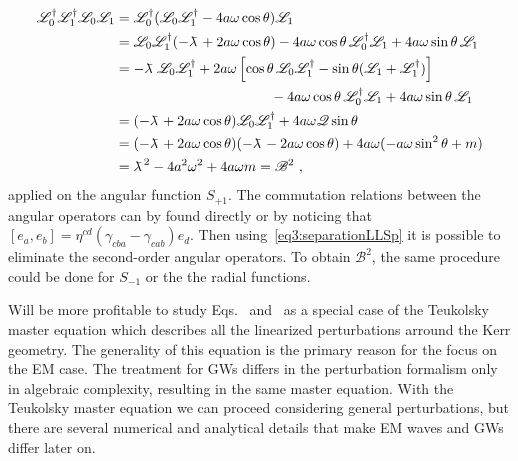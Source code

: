 \begin{align}
    \begin{split}
        \mathscr{L}^\dagger_0 \mathscr{L}^\dagger_1 \mathscr{L}_0 \mathscr{L}_1 &=
        \mathscr{L}^\dagger_0 ( \mathscr{L}_0 \mathscr{L}^\dagger_1 - 4 a\omega \cos\theta )\mathscr{L}_1 \\
        &= \mathscr{L}_0 \mathscr{L}^\dagger_1 ( - \lambdabar + 2 a\omega \cos\theta) - 4 a\omega \cos\theta \,\mathscr{L}^\dagger_0 \mathscr{L}_1 + 4 a\omega \sin\theta \,\mathscr{L}_1 \\
        &= -\lambdabar \, \mathscr{L}_0 \mathscr{L}^\dagger_1 + 2 a\omega \left[ \cos\theta \, \mathscr{L}_0 \mathscr{L}^\dagger_1 -\sin\theta(\mathscr{L}_1+\mathscr{L}^\dagger_1) \right] \\ &\mkern200mu - 4 a\omega \cos\theta \,\mathscr{L}^\dagger_0 \mathscr{L}_1 + 4 a\omega \sin\theta \,\mathscr{L}_1 \\
        &= (-\lambdabar + 2 a\omega \cos\theta ) \mathscr{L}_0 \mathscr{L}^\dagger_1 + 4 a\omega \mathscr{Q} \sin\theta \\
        &= (-\lambdabar + 2 a\omega \cos\theta ) (-\lambdabar - 2 a\omega \cos\theta ) + 4 a\omega ( -a\omega \sin^2\theta + m ) \\
        &= \lambdabar^2 - 4 a^2 \omega^2 + 4 a \omega m = \mathscr{B}^2 ~,
    \end{split}
\end{align}
applied on the angular function $S_{+1}$.
The commutation relations between the angular operators can by found directly or by noticing that $[e_a,e_b]= \eta^{cd} (\gamma_{cba}-\gamma_{cab}) e_d$.
Then using~\eqref{eq3:separationLLSp} it is possible to eliminate the second-order angular operators.
To obtain $\mathscr{B}^2$, the same procedure could be done for $S_{-1}$ or the the radial functions.

Will be more profitable to study Eqs.~ and~ as a special case of the Teukolsky master equation which describes all the linearized perturbations arround the Kerr geometry.
The generality of this equation is the primary reason for the focus on the EM case.
The treatment for GWs differs in the perturbation formalism only in algebraic complexity, resulting in the same master equation.
With the Teukolsky master equation we can proceed considering general perturbations, but there are several numerical and analytical details that make EM waves and GWs differ later on.

